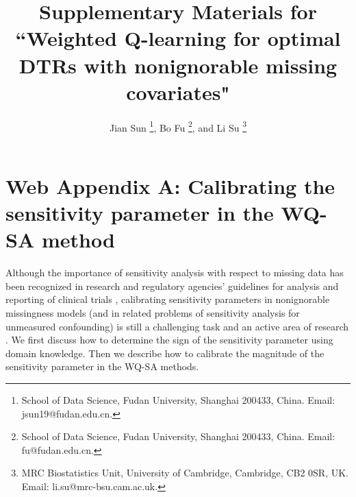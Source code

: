 \documentclass[12pt]{article}
\title{Supplementary Materials for “Weighted Q-learning for optimal DTRs with nonignorable missing covariates"}
\author{Jian Sun \thanks{School of Data Science,  Fudan University, Shanghai 200433, China. Email: jsun19@fudan.edu.cn.},  Bo Fu \thanks{School of Data Science,  Fudan University, Shanghai 200433, China. Email: fu@fudan.edu.cn.}, and Li Su \thanks{MRC Biostatistics Unit, University of Cambridge, Cambridge, CB2 0SR, UK. Email: li.su@mrc-bsu.cam.ac.uk.}}
\date{}
\begin{document}
\maketitle

\section{Web Appendix A: Calibrating the sensitivity parameter in the WQ-SA method}



Although the importance of sensitivity analysis with respect to missing data has been recognized in research and  regulatory agencies' guidelines for analysis and reporting of clinical trials \citep{little2012prevention,european2010guideline,european2020CHMP},
calibrating sensitivity parameters in  nonignorable missingness models (and  in related problems of sensitivity analysis for unmeasured confounding) is still a challenging task and an active  area of research \citep{yin2019simulation, franks2019flexible, Sjolander2022}. We first discuss how to determine the sign of the sensitivity parameter using domain knowledge. Then we describe how to calibrate the magnitude of the sensitivity parameter in the WQ-SA methods. 
\end{document}
